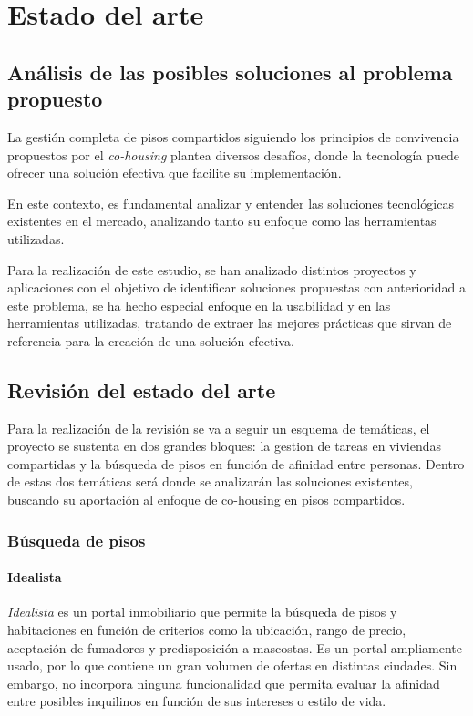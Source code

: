 \chapter{Estado del arte} \label{estado_del_arte}

\section{Análisis de las posibles soluciones al problema propuesto}
La gestión completa de pisos compartidos siguiendo los principios de convivencia propuestos por el \emph{co-housing}  plantea diversos desafíos, donde la tecnología puede ofrecer una solución efectiva que facilite su implementación.

En este contexto, es fundamental analizar y entender las soluciones tecnológicas existentes en el mercado, analizando tanto su enfoque como las herramientas utilizadas.

Para la realización de este estudio, se han analizado distintos proyectos y aplicaciones con el objetivo de identificar soluciones propuestas con anterioridad a este problema, se ha hecho especial enfoque en la usabilidad y en las herramientas utilizadas, tratando de extraer las mejores prácticas que sirvan de referencia para la creación de una solución efectiva.

\section{Revisión del estado del arte}
Para la realización de la revisión se va a seguir un esquema de temáticas, el proyecto se sustenta en dos grandes bloques: la gestion de tareas en viviendas compartidas y la búsqueda de pisos en función de afinidad entre personas. Dentro de estas dos temáticas será donde se analizarán las soluciones existentes,  buscando su aportación al enfoque de co-housing en pisos compartidos.


\subsection{Búsqueda de pisos}
\subsubsection{Idealista}
    \emph{Idealista}\cite{Idealista} es un portal inmobiliario que permite la búsqueda de pisos y habitaciones en función de criterios como la ubicación, rango de precio, aceptación de fumadores y predisposición a mascostas. Es un portal ampliamente usado, por lo que contiene un gran volumen de ofertas en distintas ciudades.
    Sin embargo, no incorpora ninguna funcionalidad que permita evaluar la afinidad entre posibles inquilinos en función de sus intereses o estilo de vida. 

